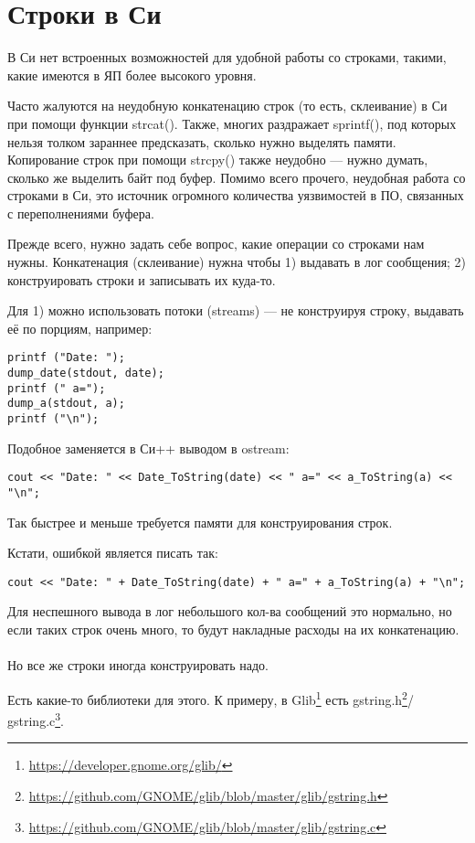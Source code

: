 \chapter{Строки в Си}

В Си нет встроенных возможностей для удобной работы со строками, такими, какие имеются в ЯП более
высокого уровня.

Часто жалуются на неудобную
конкатенацию строк (то есть, склеивание) в Си при помощи функции strcat(). Также, многих раздражает sprintf(),
под которых нельзя толком зараннее предсказать, сколько нужно выделять памяти. Копирование строк при помощи
strcpy() также неудобно --- нужно думать, сколько же выделить байт под буфер. Помимо всего прочего, неудобная
работа со строками в Си, это источник огромного количества уязвимостей в ПО, связанных с переполнениями буфера\cite[1.14.2]{REBook}.

Прежде всего, нужно задать себе вопрос, какие операции со строками нам нужны.
Конкатенация (склеивание) нужна чтобы 1) выдавать в лог сообщения; 2) конструировать строки и записывать их куда-то.

Для 1) можно использовать потоки (streams) --- не конструируя строку, выдавать её по порциям, например:

\begin{lstlisting}
printf ("Date: ");
dump_date(stdout, date);
printf (" a=");
dump_a(stdout, a);
printf ("\n");
\end{lstlisting}

Подобное заменяется в Си++ выводом в ostream:

\begin{lstlisting}
cout << "Date: " << Date_ToString(date) << " a=" << a_ToString(a) << "\n";
\end{lstlisting}

Так быстрее и меньше требуется памяти для конструирования строк.

Кстати, ошибкой является писать так:

\begin{lstlisting}
cout << "Date: " + Date_ToString(date) + " a=" + a_ToString(a) + "\n";
\end{lstlisting}

Для неспешного вывода в лог небольшого кол-ва сообщений это нормально, но если таких строк очень много, то будут
накладные расходы на их конкатенацию. \\
\\
Но все же строки иногда конструировать надо.

Есть какие-то библиотеки для этого.
К примеру, в Glib\footnote{\url{https://developer.gnome.org/glib/}} есть 
gstring.h\footnote{\url{https://github.com/GNOME/glib/blob/master/glib/gstring.h}}/
gstring.c\footnote{\url{https://github.com/GNOME/glib/blob/master/glib/gstring.c}}. 

